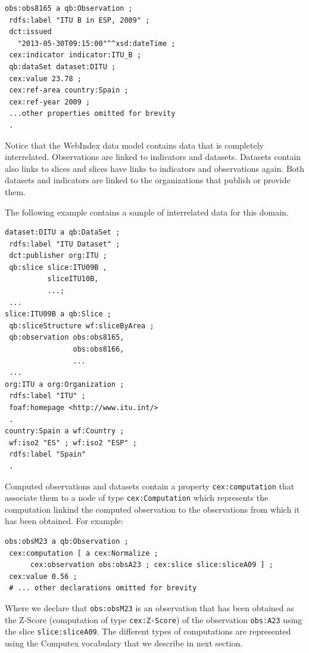 \documentclass{llncs}
\begin{document}
\begin{lstlisting}[style=SPARQL]
obs:obs8165 a qb:Observation ;
 rdfs:label "ITU B in ESP, 2009" ;
 dct:issued
   "2013-05-30T09:15:00"^^xsd:dateTime ;
 cex:indicator indicator:ITU_B ;
 qb:dataSet dataset:DITU ;
 cex:value 23.78 ;
 cex:ref-area country:Spain ;
 cex:ref-year 2009 ;
 ...other properties omitted for brevity
 .
\end{lstlisting}

Notice that the WebIndex data model contains data that is completely interrelated. Observations are linked to indicators and datasets. Datasets contain also links to slices and slices have links to indicators and observations again. 
Both datasets and indicators are linked to the organizations that publish or provide them. 

The following example contains a sample of interrelated 
data for this domain. 
 
\begin{lstlisting}[style=SPARQL]
dataset:DITU a qb:DataSet ;
 rdfs:label "ITU Dataset" ;
 dct:publisher org:ITU ;
 qb:slice slice:ITU09B , 
          sliceITU10B, 
          ...;
 ...
slice:ITU09B a qb:Slice ;
 qb:sliceStructure wf:sliceByArea ;
 qb:observation obs:obs8165,
                obs:obs8166,
                ...
 ...
org:ITU a org:Organization ;
 rdfs:label "ITU" ;
 foaf:homepage <http://www.itu.int/>
 .
country:Spain a wf:Country ;
 wf:iso2 "ES" ; wf:iso2 "ESP" ;
 rdfs:label "Spain" 
 .
\end{lstlisting}

Computed observations and datasets contain a property \lstinline|cex:computation| that associate them to a node of type \lstinline|cex:Computation| which represents the computation linkind the computed observation to the observations
from which it has been obtained.
For example:

\begin{lstlisting}[style=SPARQL]
obs:obsM23 a qb:Observation ;
 cex:computation [ a cex:Normalize ; 
      cex:observation obs:obsA23 ; cex:slice slice:sliceA09 ] ;
 cex:value 0.56 ;
 # ... other declarations omitted for brevity
\end{lstlisting}

Where we declare that \lstinline|obs:obsM23| is an observation
 that has been obtained as the Z-Score (computation of type \lstinline|cex:Z-Score|)
 of the observation \lstinline|obs:A23| using the slice
 \lstinline|slice:sliceA09|. 
 The different types of computations are represented using the Computex vocabulary that we describe in next section.
 
\end{document}
